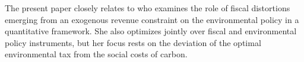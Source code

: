 The present paper closely relates to \cite{Barrage2019OptimalPolicy} who examines the role of fiscal distortions emerging from an exogenous revenue constraint on the environmental policy in a quantitative framework. She also optimizes jointly over fiscal and environmental policy instruments, but her focus rests on the deviation of the optimal environmental tax from the social costs of carbon.
\begin{comment}
One of this paper's contributions is to discuss the existence of an upper bound on the reduction of distortionary income taxes: the weak double-dividend literature rests on the assumption that no lump-sum transfers and taxes are available. When this is the case, this paper shows that absent a government funding constraint, distortionary taxes should be set to reduce labor supply: some reduction in hours is in fact efficient from an environmental perspective. However, a shrinking labor supply is generally perceived as an inefficiency in this literature and environmental taxes on its own as efficient. The importance of lump-sum transfers to implement the efficient allocation receives less attention.  %


content...
\end{comment}



